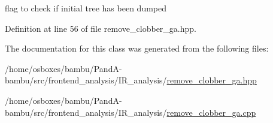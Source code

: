 flag to check if initial tree has been dumped 



Definition at line 56 of file remove\+\_\+clobber\+\_\+ga.\+hpp.



The documentation for this class was generated from the following files\+:\begin{DoxyCompactItemize}
\item 
/home/osboxes/bambu/\+Pand\+A-\/bambu/src/frontend\+\_\+analysis/\+I\+R\+\_\+analysis/\hyperlink{remove__clobber__ga_8hpp}{remove\+\_\+clobber\+\_\+ga.\+hpp}\item 
/home/osboxes/bambu/\+Pand\+A-\/bambu/src/frontend\+\_\+analysis/\+I\+R\+\_\+analysis/\hyperlink{remove__clobber__ga_8cpp}{remove\+\_\+clobber\+\_\+ga.\+cpp}\end{DoxyCompactItemize}
